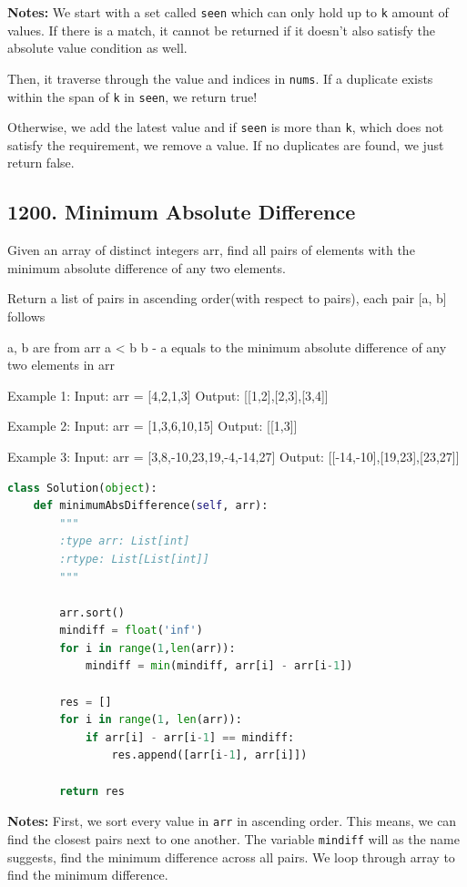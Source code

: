 \documentclass[11pt]{article}
\begin{document}
\noindent \textbf{Notes:} We start with a set called \texttt{seen} which can only hold up to \texttt{k} amount of values. If there is a match, it cannot be returned if it doesn't also satisfy the absolute value condition as well. 

\noindent Then, it traverse through the value and indices in \texttt{nums}. If a duplicate exists within the span of \texttt{k} in \texttt{seen}, we return true!

\noindent Otherwise, we add the latest value and if \texttt{seen} is more than \texttt{k}, which does not satisfy the requirement, we remove a value. If no duplicates are found, we just return false.
\subsection*{1200. Minimum Absolute Difference}
Given an array of distinct integers arr, find all pairs of elements with the minimum absolute difference of any two elements.

Return a list of pairs in ascending order(with respect to pairs), each pair [a, b] follows

    a, b are from arr
    a < b
    b - a equals to the minimum absolute difference of any two elements in arr
 

Example 1:
Input: arr = [4,2,1,3]
Output: [[1,2],[2,3],[3,4]]

Example 2:
Input: arr = [1,3,6,10,15]
Output: [[1,3]]

Example 3:
Input: arr = [3,8,-10,23,19,-4,-14,27]
Output: [[-14,-10],[19,23],[23,27]]

\begin{lstlisting}[language=python, mathescape=true]
class Solution(object):
    def minimumAbsDifference(self, arr):
        """
        :type arr: List[int]
        :rtype: List[List[int]]
        """
        
        arr.sort()
        mindiff = float('inf')
        for i in range(1,len(arr)):
            mindiff = min(mindiff, arr[i] - arr[i-1])

        res = []
        for i in range(1, len(arr)):
            if arr[i] - arr[i-1] == mindiff:
                res.append([arr[i-1], arr[i]])
        
        return res
\end{lstlisting}
\noindent \textbf{Notes:} First, we sort every value in \texttt{arr} in ascending order. This means, we can find the closest pairs next to one another. The variable \texttt{mindiff} will as the name suggests, find the minimum difference across all pairs. We loop through array to find the minimum difference.
\end{document}
